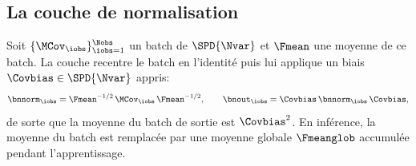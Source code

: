 
\subsection{La couche de normalisation}
\label{sec:spdnet-batchnorm-couche}

\begin{definition}
\label{def:spdnet-batchnorm}
  Soit $\{\MCov_\iobs\}_{\iobs=1}^{\Nobs}$ un batch de $\SPD{\Nvar}$ et $\Fmean$
  une moyenne de ce batch. La couche recentre le batch en l'identité puis lui
  applique un biais $\Covbias\in\SPD{\Nvar}$ appris:
  \begin{equation}
    \bnnorm_\iobs
    =
    \Fmean^{-1/2}\,\MCov_\iobs\,\Fmean^{-1/2},
    \qquad
    \bnout_\iobs
    =
    \Covbias\,\bnnorm_\iobs\,\Covbias,
    \label{eq:spdnet-batchnorm}
  \end{equation}
  de sorte que la moyenne du batch de sortie est $\Covbias^2$. En inférence, la
  moyenne du batch est remplacée par une moyenne globale $\Fmeanglob$ accumulée
  pendant l'apprentissage.
\end{definition}

